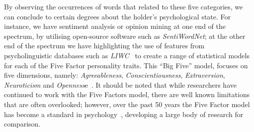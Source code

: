 \documentclass[graybox]{svmult}
\begin{document}

By observing the occurrences of words that related to these five
categories, we can conclude to certain degrees about the holder's
psychological state. For instance, we have sentiment analysis or
opinion mining at one end of the spectrum, by utilising open-source
software such as {\emph{SentiWordNet}}; at the other end of the
spectrum we have \citet{mairesse-et-al:2007} highlighting the use of
features from psycholinguistic databases such as
{\emph{LIWC}}~\citep{pennebaker-et-al:2001} to create a range of
statistical models for each of the Five Factor personality
traits. This ``Big Five'' model, focuses on five dimensions, namely:
{\emph{Agreeableness}}, {\emph{Conscientiousness}},
{\emph{Extraversion}}, {\emph{Neuroticism}} and
{\emph{Openness}}e~\citep{norman:1963,peabody+goldberg:1989}. It
should be noted that while researchers have continued to work with the
Five Factors model, there are well known
limitations~\cite{eysenck:1992,paunonen+jackson:2000,block:2010} that
are often overlooked; however, over the past 50 years the Five Factor
model has become a standard in psychology~\cite{mairesse-et-al:2007},
developing a large body of research for comparison.

\end{document}
